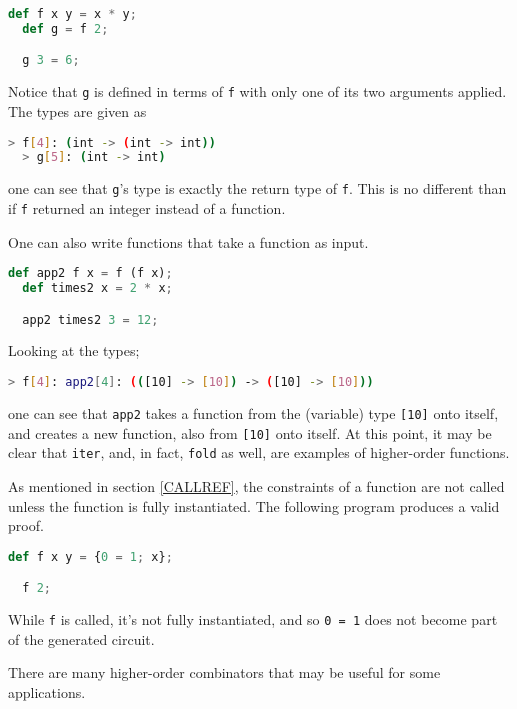 \begin{lstlisting}[language=Python]
  def f x y = x * y;
  def g = f 2;

  g 3 = 6;
\end{lstlisting}

Notice that \lstinline{g} is defined in terms of \lstinline{f} with only one of its two arguments applied. The types are given as

\begin{lstlisting}[language=bash]
  > f[4]: (int -> (int -> int))
  > g[5]: (int -> int)
\end{lstlisting}

one can see that \lstinline{g}'s type is exactly the return type of \lstinline{f}. This is no different than if \lstinline{f} returned an integer instead of a function.

One can also write functions that take a function as input.

\begin{lstlisting}[language=Python]
  def app2 f x = f (f x);
  def times2 x = 2 * x;

  app2 times2 3 = 12;
\end{lstlisting}

Looking at the types;

\begin{lstlisting}[language=bash]
  > f[4]: app2[4]: (([10] -> [10]) -> ([10] -> [10]))
\end{lstlisting}

one can see that \lstinline{app2} takes a function from the (variable) type \lstinline{[10]} onto itself, and creates a new function, also from \lstinline{[10]} onto itself. At this point, it may be clear that \lstinline{iter}, and, in fact, \lstinline{fold} as well, are examples of higher-order functions.

As mentioned in section \ref{CALLREF}, the constraints of a function are not called unless the function is fully instantiated. The following program produces a valid proof.

\begin{lstlisting}[language=Python]
  def f x y = {0 = 1; x};

  f 2;
\end{lstlisting}

While \lstinline{f} is called, it's not fully instantiated, and so \lstinline{0 = 1} does not become part of the generated circuit.

There are many higher-order combinators that may be useful for some applications.

